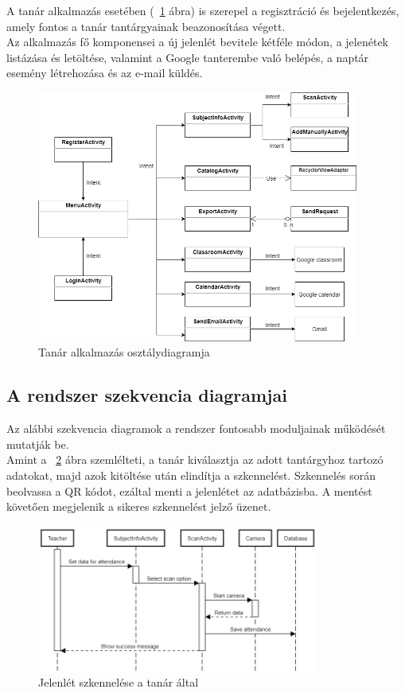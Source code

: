 \documentclass[12pt]{article}
\numberwithin{figure}{section}
\numberwithin{equation}{section}
\begin{document}
\hfill\break
A tanár alkalmazás esetében (~\ref{fig:class1} ábra) is szerepel a regisztráció és bejelentkezés, amely fontos a tanár tantárgyainak beazonosítása végett.\\
Az alkalmazás fő komponensei a új jelenlét bevitele kétféle módon, a jelenétek listázása és letöltése, valamint a Google tanterembe való belépés, a naptár esemény létrehozása és az e-mail küldés.\\

\begin{figure}[H]
	\centering
	\includegraphics[width=400px]{teacher_class.png}
	\caption{Tanár alkalmazás osztálydiagramja}
	\label{fig:class1}
\end{figure}

\hfill\break

\subsection{A rendszer szekvencia diagramjai}

Az alábbi szekvencia diagramok a rendszer fontosabb moduljainak működését mutatják be.\\
Amint a ~\ref{fig:seq1} ábra szemlélteti, a tanár kiválasztja az adott tantárgyhoz tartozó adatokat, majd azok kitöltése után elindítja a szkennelést. Szkennelés során beolvassa a QR kódot, ezáltal menti a jelenlétet az adatbázisba. A mentést követően megjelenik a sikeres szkennelést jelző üzenet.\\

\begin{figure}[H]
	\centering
	\includegraphics[width=350px]{seq_addScan1.png}
	\caption{Jelenlét szkennelése a tanár által}
	\label{fig:seq1}
\end{figure}
\end{document}

